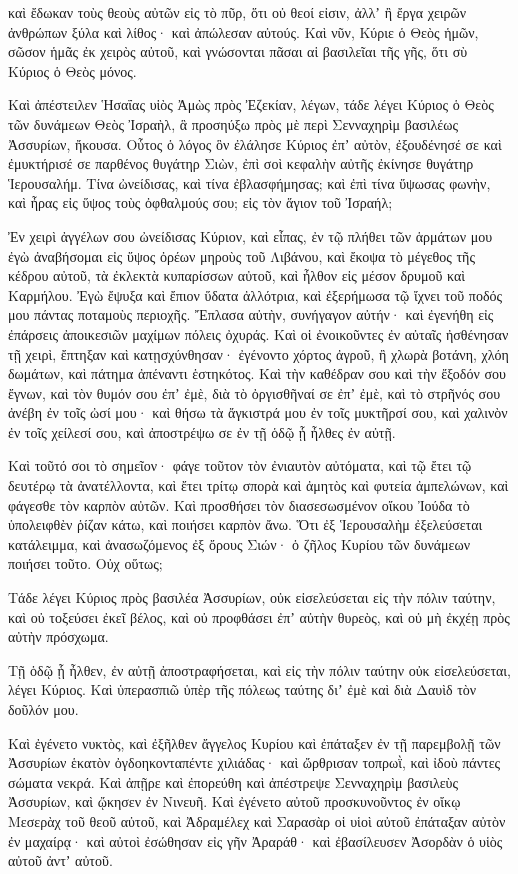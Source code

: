 {καὶ ἔδωκαν τοὺς θεοὺς αὐτῶν εἰς τὸ πῦρ, ὅτι οὐ θεοί εἰσιν, ἀλλʼ ἢ ἔργα χειρῶν ἀνθρώπων ξύλα καὶ λίθος· καὶ ἀπώλεσαν αὐτούς.
Καὶ νῦν, Κύριε ὁ Θεὸς ἡμῶν, σῶσον ἡμᾶς ἐκ χειρὸς αὐτοῦ, καὶ γνώσονται πᾶσαι αἱ βασιλεῖαι τῆς γῆς, ὅτι σὺ Κύριος ὁ Θεὸς μόνος.
\par }{\PP {}Καὶ ἀπέστειλεν Ἡσαΐας υἱὸς Ἀμὼς πρὸς Ἐζεκίαν, λέγων, τάδε λέγει Κύριος ὁ Θεὸς τῶν δυνάμεων Θεὸς Ἰσραὴλ, ἃ προσηύξω πρὸς μὲ περὶ Σενναχηρὶμ βασιλέως Ἀσσυρίων, ἤκουσα.
Οὗτος ὁ λόγος ὃν ἐλάλησε Κύριος ἐπʼ αὐτὸν, ἐξουδένησέ σε καὶ ἐμυκτήρισέ σε παρθένος θυγάτηρ Σιὼν, ἐπὶ σοὶ κεφαλὴν αὐτῆς ἐκίνησε θυγάτηρ Ἱερουσαλήμ.
Τίνα ὠνείδισας, καὶ τίνα ἐβλασφήμησας; καὶ ἐπὶ τίνα ὕψωσας φωνὴν, καὶ ἦρας εἰς ὕψος τοὺς ὀφθαλμούς σου; εἰς τὸν ἅγιον τοῦ Ἰσραήλ;
\par }{\PP {}Ἐν χειρὶ ἀγγέλων σου ὠνείδισας Κύριον, καὶ εἶπας, ἐν τῷ πλήθει τῶν ἁρμάτων μου ἐγὼ ἀναβήσομαι εἰς ὕψος ὀρέων μηροὺς τοῦ Λιβάνου, καὶ ἔκοψα τὸ μέγεθος τῆς κέδρου αὐτοῦ, τὰ ἐκλεκτὰ κυπαρίσσων αὐτοῦ, καὶ ἦλθον εἰς μέσον δρυμοῦ καὶ Καρμήλου.
Ἐγὼ ἔψυξα καὶ ἔπιον ὕδατα ἀλλότρια, καὶ ἐξερήμωσα τῷ ἴχνει τοῦ ποδός μου πάντας ποταμοὺς περιοχῆς.
Ἔπλασα αὐτὴν, συνήγαγον αὐτήν· καὶ ἐγενήθη εἰς ἐπάρσεις ἀποικεσιῶν μαχίμων πόλεις ὀχυράς.
Καὶ οἱ ἐνοικοῦντες ἐν αὐταῖς ἠσθένησαν τῇ χειρὶ, ἔπτηξαν καὶ κατῃσχύνθησαν· ἐγένοντο χόρτος ἀγροῦ, ἢ χλωρὰ βοτάνη, χλόη δωμάτων, καὶ πάτημα ἀπέναντι ἑστηκότος.
Καὶ τὴν καθέδραν σου καὶ τὴν ἔξοδόν σου ἔγνων, καὶ τὸν θυμόν σου ἐπʼ ἐμὲ,
διὰ τὸ ὀργισθῆναί σε ἐπʼ ἐμὲ, καὶ τὸ στρῆνός σου ἀνέβη ἐν τοῖς ὠσί μου· καὶ θήσω τὰ ἄγκιστρά μου ἐν τοῖς μυκτῆρσί σου, καὶ χαλινὸν ἐν τοῖς χείλεσί σου, καὶ ἀποστρέψω σε ἐν τῇ ὁδῷ ᾗ ἦλθες ἐν αὐτῇ.
\par }{\PP {}Καὶ τοῦτό σοι τὸ σημεῖον· φάγε τοῦτον τὸν ἐνιαυτὸν αὐτόματα, καὶ τῷ ἔτει τῷ δευτέρῳ τὰ ἀνατέλλοντα, καὶ ἔτει τρίτῳ σπορὰ καὶ ἀμητὸς καὶ φυτεία ἀμπελώνων, καὶ φάγεσθε τὸν καρπὸν αὐτῶν.
Καὶ προσθήσει τὸν διασεσωσμένον οἴκου Ἰούδα τὸ ὑπολειφθὲν ῥίζαν κάτω, καὶ ποιήσει καρπὸν ἄνω.
Ὅτι ἐξ Ἱερουσαλὴμ ἐξελεύσεται κατάλειμμα, καὶ ἀνασωζόμενος ἐξ ὄρους Σιών· ὁ ζῆλος Κυρίου τῶν δυνάμεων ποιήσει τοῦτο.
Οὐχ οὕτως;
\par }{\PP Τάδε λέγει Κύριος πρὸς βασιλέα Ἀσσυρίων, οὐκ εἰσελεύσεται εἰς τὴν πόλιν ταύτην, καὶ οὐ τοξεύσει ἐκεῖ βέλος, καὶ οὐ προφθάσει ἐπʼ αὐτὴν θυρεὸς, καὶ οὐ μὴ ἐκχέῃ πρὸς αὐτὴν πρόσχωμα.
\par }{\PP {}Τῇ ὁδῷ ᾗ ἦλθεν, ἐν αὐτῇ ἀποστραφήσεται, καὶ εἰς τὴν πόλιν ταύτην οὐκ εἰσελεύσεται, λέγει Κύριος.
Καὶ ὑπερασπιῶ ὑπὲρ τῆς πόλεως ταύτης διʼ ἐμὲ καὶ διὰ Δαυὶδ τὸν δοῦλόν μου.
\par }{\PP {}Καὶ ἐγένετο νυκτὸς, καὶ ἐξῆλθεν ἄγγελος Κυρίου καὶ ἐπάταξεν ἐν τῇ παρεμβολῇ τῶν Ἀσσυρίων ἑκατὸν ὀγδοηκονταπέντε χιλιάδας· καὶ ὤρθρισαν τοπρωῒ, καὶ ἰδοὺ πάντες σώματα νεκρά.
Καὶ ἀπῇρε καὶ ἐπορεύθη καὶ ἀπέστρεψε Σενναχηρὶμ βασιλεὺς Ἀσσυρίων, καὶ ᾤκησεν ἐν Νινευῆ.
Καὶ ἐγένετο αὐτοῦ προσκυνοῦντος ἐν οἴκῳ Μεσερὰχ τοῦ θεοῦ αὐτοῦ, καὶ Ἀδραμέλεχ καὶ Σαρασὰρ οἱ υἱοὶ αὐτοῦ ἐπάταξαν αὐτὸν ἐν μαχαίρᾳ· καὶ αὐτοὶ ἐσώθησαν εἰς γῆν Ἀραράθ· καὶ ἐβασίλευσεν Ἀσορδὰν ὁ υἱὸς αὐτοῦ ἀντʼ αὐτοῦ.

}
